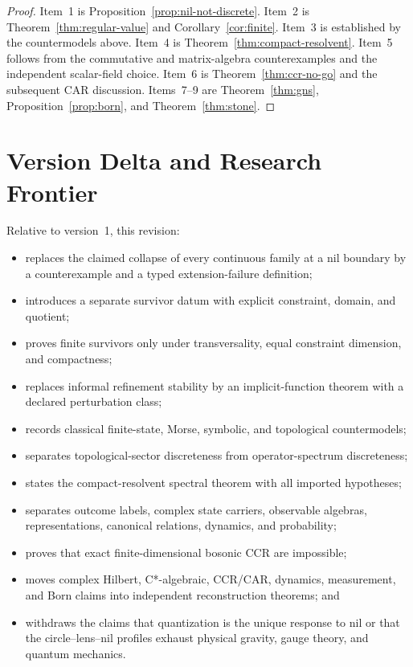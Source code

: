 \documentclass[11pt]{article}
\begin{document}
\begin{proof}
Item~1 is Proposition~\ref{prop:nil-not-discrete}.  Item~2 is
Theorem~\ref{thm:regular-value} and Corollary~\ref{cor:finite}.  Item~3 is
established by the countermodels above.  Item~4 is
Theorem~\ref{thm:compact-resolvent}.  Item~5 follows from the commutative and
matrix-algebra counterexamples and the independent scalar-field choice.
Item~6 is Theorem~\ref{thm:ccr-no-go} and the subsequent CAR discussion.
Items~7--9 are Theorem~\ref{thm:gns},
Proposition~\ref{prop:born}, and Theorem~\ref{thm:stone}.
\end{proof}

\section{Version Delta and Research Frontier}

Relative to version~1, this revision:
\begin{itemize}
\item replaces the claimed collapse of every continuous family at a nil
boundary by a counterexample and a typed extension-failure definition;
\item introduces a separate survivor datum with explicit constraint, domain,
and quotient;
\item proves finite survivors only under transversality, equal constraint
dimension, and compactness;
\item replaces informal refinement stability by an implicit-function theorem
with a declared perturbation class;
\item records classical finite-state, Morse, symbolic, and topological
countermodels;
\item separates topological-sector discreteness from operator-spectrum
discreteness;
\item states the compact-resolvent spectral theorem with all imported
hypotheses;
\item separates outcome labels, complex state carriers, observable algebras,
representations, canonical relations, dynamics, and probability;
\item proves that exact finite-dimensional bosonic CCR are impossible;
\item moves complex Hilbert, C*-algebraic, CCR/CAR, dynamics, measurement, and
Born claims into independent reconstruction theorems; and
\item withdraws the claims that quantization is the unique response to nil or
that the circle--lens--nil profiles exhaust physical gravity, gauge theory, and
quantum mechanics.
\end{itemize}
\end{document}
